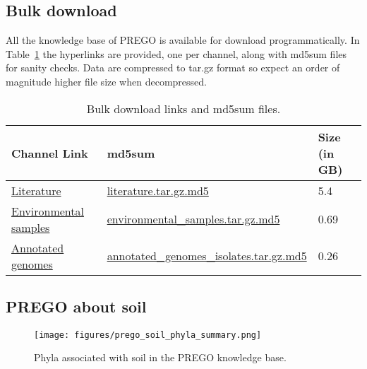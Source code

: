 \subsection{Bulk download}
\label{bulk-download}

All the knowledge base of PREGO is available for download programmatically.
In Table~\ref{table:prego-appD-1} the hyperlinks are provided, one per channel, along with md5sum files for sanity checks.
Data are compressed to tar.gz format so expect an order of magnitude higher file size when decompressed.

   \begin{table}[ht]
      

      \begin{tabular}{lll}
      \toprule
      Channel Link & md5sum & Size (in GB) \\ \midrule

      \href{https://prego.hcmr.gr/download/literature.tar.gz}{Literature} & \href{https://prego.hcmr.gr/download/literature.tar.gz.md5}{literature.tar.gz.md5} & 5.4 \\

      \href{https://prego.hcmr.gr/download/environmental\_samples.tar.gz}{Environmental samples} & 
      \href{https://prego.hcmr.gr/download/environmental\_samples.tar.gz.md5}{environmental\_samples.tar.gz.md5}
      & 0.69 \\

      \href{https://prego.hcmr.gr/download/annotated\_genomes\_isolates.tar.gz}{Annotated genomes} &
      \href{https://prego.hcmr.gr/download/annotated\_genomes\_isolates.tar.gz.md5}{annotated\_genomes\_isolates.tar.gz.md5} & 0.26 \\ \bottomrule
      \end{tabular}
      \caption[PREGO Bulk download.]{Bulk download links and md5sum files.}
      \label{table:prego-appD-1}
   \end{table}



   \subsection{PREGO about soil}
   \label{subsec:prego-soil}


   \begin{figure}[hbt!]
      \centering
      \texttt{[image: figures/prego\_soil\_phyla\_summary.png]}
      \caption[PREGO soil taxonomy summary]{
         Phyla associated with soil in the PREGO knowledge base.}
      \label{fig:prego-soil-phyla}
   \end{figure}



